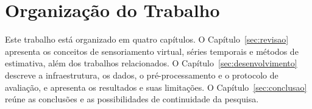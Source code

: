\section{Organização do Trabalho}
Este trabalho está organizado em quatro capítulos. O
Capítulo~\ref{sec:revisao} apresenta os conceitos de sensoriamento virtual,
séries temporais e métodos de estimativa, além dos trabalhos relacionados.
O Capítulo~\ref{sec:desenvolvimento} descreve a infraestrutura, os dados,
o pré-processamento e o protocolo de avaliação, e apresenta os resultados
e suas limitações. O Capítulo~\ref{sec:conclusao} reúne as conclusões e as
possibilidades de continuidade da pesquisa.
